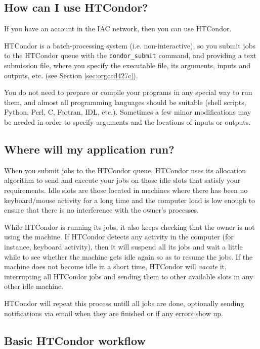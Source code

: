 \documentclass[a4paper,10pt]{article}
\begin{document}
\subsection{How can I use HTCondor?}
\label{sec:org9152c35}

If you have an account in the IAC network, then you can use HTCondor. 

HTCondor is a batch-processing system (i.e. non-interactive), so you submit jobs
to the HTCondor queue with the \texttt{condor\_submit} command, and providing a text
submission file, where you specify the executable file, its arguments, inputs
and outputs, etc. (see Section \ref{sec:orgccd427c}).

You do not need to prepare or compile your programs in any special way to run
them, and almost all programming languages should be suitable (shell scripts,
Python, Perl, C, Fortran, IDL, etc.). Sometimes a few minor modifications may be
needed in order to specify arguments and the locations of inputs or outputs.

\subsection{Where will my application run?}
\label{sec:org9425813}

When you submit jobs to the HTCondor queue, HTCondor uses its allocation
algorithm to send and execute your jobs on those idle slots that satisfy your
requirements. Idle slots are those located in machines where there has been no
keyboard/mouse activity for a long time and the computer load is low enough to
ensure that there is no interference with the owner's processes. 

While HTCondor is running its jobs, it also keeps checking that the owner is not
using the machine. If HTCondor detects any activity in the computer (for
instance, keyboard activity), then it will suspend all its jobs and wait a
little while to see whether the machine gets idle again so as to resume the
jobs. If the machine does not become idle in a short time, HTCondor will
\emph{vacate} it, interrupting all HTCondor jobs and sending them to other available
slots in any other idle machine. 

HTCondor will repeat this process untill all jobs are done, optionally sending
notifications via email when they are finished or if any errors show up.


\subsection{Basic HTCondor workflow}
\label{sec:orgbc3e2a5}
\end{document}
